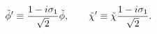 \begin{equation}
\tilde \phi' \equiv 
{1 - i \sigma_1 \over \sqrt2} \tilde \phi, 
\qquad 
\tilde \chi' \equiv  \tilde \chi 
{1 - i \sigma_1 \over \sqrt2} 
.
\end{equation}

